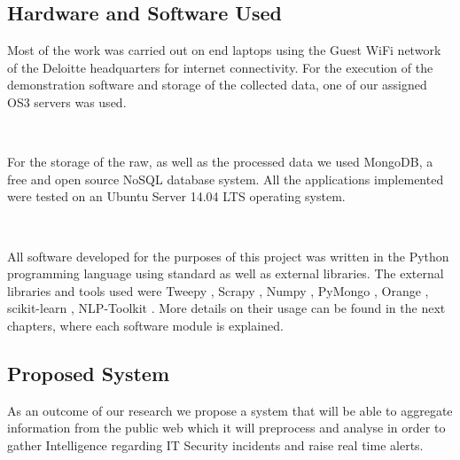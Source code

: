 \documentclass[12pt]{article}
\begin{document}
\subsection{Hardware and Software Used}
\parbox{\linewidth}{
Most of the work was carried out on end laptops using the Guest WiFi network of the Deloitte\cite{deloitte} headquarters for internet connectivity. For the execution of the demonstration software and storage of the collected data, one of our assigned OS3 servers was used.
}
\hfill \break \\
\parbox{\linewidth}{
For the storage of the raw, as well as the processed data we used MongoDB\cite{mongodb}, a free and open source NoSQL database system. All the applications implemented were tested on an Ubuntu Server 14.04 LTS \cite{ubuntu} operating system.
}
\hfill \break \\ 
\parbox{\linewidth}{
All software developed for the purposes of this project was written in the Python\cite{python} programming language using standard as well as external libraries. The external libraries and tools used were Tweepy \cite{tweepy}, Scrapy \cite{scrapy}, Numpy \cite{numpy}, PyMongo \cite{pymongo}, Orange \cite{orange}, scikit-learn \cite{sklearn}, NLP-Toolkit \cite{nltk}. More details on their usage can be found in the next chapters, where each software module is explained.
}
\subsection{Proposed System}
As an outcome of our research we propose a system that will be able to aggregate information from the public web which it will preprocess and analyse in order to gather Intelligence regarding IT Security incidents and raise real time alerts. 
\end{document}
